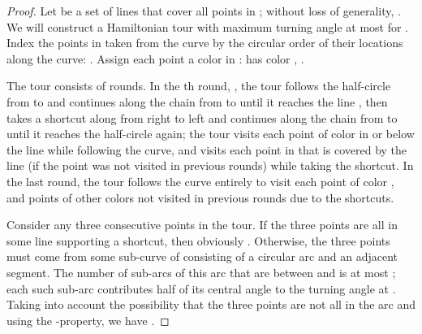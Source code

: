 \documentclass[letterpaper,11pt]{article}
\begin{document}
\begin{proof}
Let 
be a set of  lines that cover all points in ;
without loss of generality, .
We will construct a Hamiltonian tour with maximum turning angle at most
 for .
Index the  points in  taken from the curve 
by the circular order of their locations along the curve:
.
Assign each point a color in :
 has color , .

The tour consists of  rounds.
In the th round, ,
the tour follows the half-circle from  to  and continues along the
chain from  to  until it reaches the line ,
then takes a shortcut along  from right to left
and continues along the chain from  to 
until it reaches the half-circle again;
the tour visits each point of color 
in or below the line  while following the curve,
and visits each point in  that is covered by the line 
(if the point was not visited in previous rounds)
while taking the shortcut.
In the last round, the tour follows the curve entirely
to visit each point of color ,
and points of other colors not visited in previous rounds due to the shortcuts.

Consider any three consecutive points  in the tour.
If the three points are all in some line  supporting a shortcut,
then obviously .
Otherwise, the three points must come from some sub-curve of 
consisting of a circular arc and an adjacent segment.
The number of sub-arcs of this arc that are between  and 
is at most ;
each such sub-arc contributes half of its central angle
to the turning angle at .
Taking into account the possibility that
the three points are not all in the arc
and using the -property,
we have
.
\end{proof}
\end{document}
